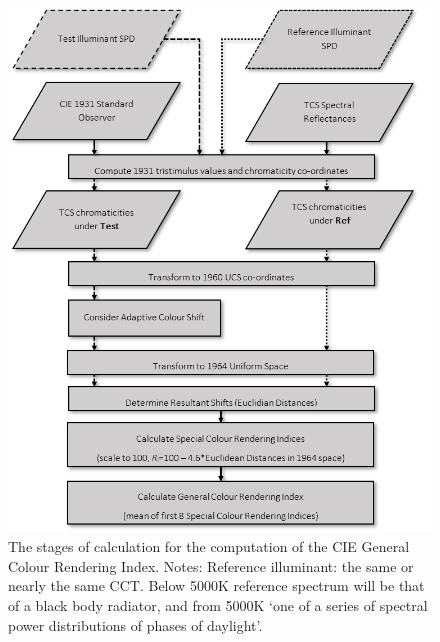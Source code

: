 \begin{figure}[htbp]
\includegraphics[max width=\textwidth]{figs/LitRev/criflow.png}
\caption{The stages of calculation for the computation of the \gls{CIE} General Colour Rendering Index. Notes: Reference illuminant: the same or nearly the same \gls{CCT}. Below 5000K reference spectrum will be that of a black body radiator, and from 5000K `one of a series of spectral power distributions of phases of daylight'.}
\label{fig:criflow}
\end{figure}

\clearpage
